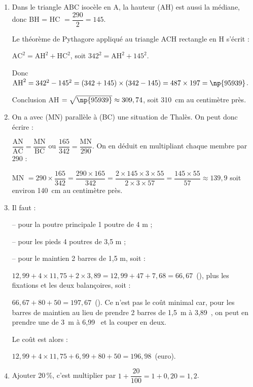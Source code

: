\documentclass[10pt]{article}
\newcommand{\euro}{\eurologo{}}
\begin{document}
\begin{enumerate}
\item %
Dans le triangle ABC isocèle en A, la hauteur (AH) est aussi la médiane, donc BH = HC $= \dfrac{290}{2} = 145$.

Le théorème de Pythagore appliqué au triangle ACH rectangle en H s'écrit :

$\text{AC}^2 = \text{AH}^2 + \text{HC}^2$, soit $342^2 = \text{AH}^2 + 145^2$.

Donc $\text{AH}^2 = 342^2 - 145^2 = (342 + 145)\times (342 - 145) = 487 \times 197 = \np{95939}$.

Conclusion AH $ = \sqrt{\np{95939}} \approx 309,74$, soit 310~cm au centimètre près.
\item %
On a avec (MN) parallèle à (BC) une situation de Thalès. On peut donc écrire :

$\dfrac{\text{AN}}{\text{AC}} = \dfrac{\text{MN}}{\text{BC}}$ ou $\dfrac{165}{342} = \dfrac{\text{MN}}{290}$. On en déduit en multipliant chaque membre par 290 :

MN $ = 290 \times \dfrac{165}{342} = \dfrac{290 \times 165}{342} = \dfrac{2 \times 145 \times 3 \times 55}{2 \times 3 \times 57} = \dfrac{145 \times 55}{57} \approx 139,9$ soit environ 140~cm au centimètre près.
\item %
Il faut :

-- pour la poutre principale 1 poutre de 4 m ;

-- pour les pieds 4 poutres de 3,5 m ;

-- pour le maintien 2 barres de 1,5 m, soit :

$12,99 + 4 \times 11,75 + 2 \times 3,89 = 12,99 + 47 + 7,68 = 66,67$~(\euro), plus les fixations et les deux balançoires, soit :

$66,67 + 80 + 50 = 197,67$~(\euro).
Ce n'est pas le coût minimal car, pour les barres de maintien au lieu de prendre 2 barres de 1,5~m à 3,89~\euro{}, on peut en prendre une de 3~m à 6,99~\euro{} et la couper en deux.

Le coût est alors : 

$12,99 + 4 \times 11,75 +  6,99 + 80 + 50 = 196,98$~(euro).
\item %
Ajouter 20\,\%, c'est multiplier par $1 + \dfrac{20}{100} = 1 + 0,20 = 1,2$.


\end{enumerate}
\end{document}
